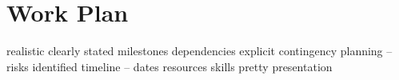\chapter{Work Plan}
\label{chap:plan}

realistic
clearly stated milestones
dependencies explicit
contingency planning – risks identified
timeline – dates
resources
skills
pretty presentation
